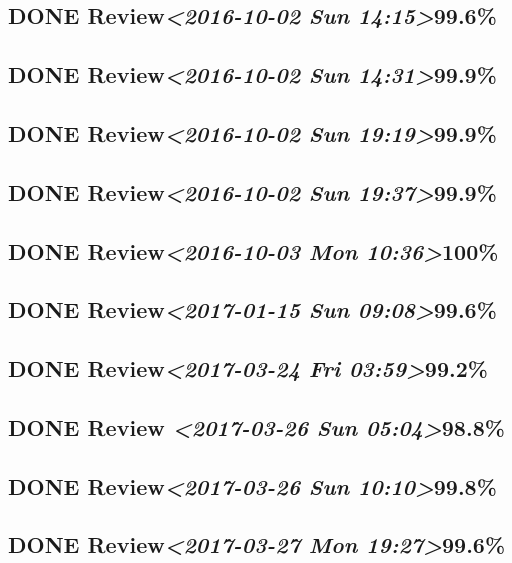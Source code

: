\documentclass[11pt]{ctexart}
\begin{document}
\subsection{{\bfseries\sffamily DONE} Review\textit{<2016-10-02 Sun 14:15>}99.6\%}
\label{sec:orgaa104fb}
\subsection{{\bfseries\sffamily DONE} Review\textit{<2016-10-02 Sun 14:31>}99.9\%}
\label{sec:org851fc4e}
\subsection{{\bfseries\sffamily DONE} Review\textit{<2016-10-02 Sun 19:19>}99.9\%}
\label{sec:orgf1fa181}
\subsection{{\bfseries\sffamily DONE} Review\textit{<2016-10-02 Sun 19:37>}99.9\%}
\label{sec:org8ce1131}
\subsection{{\bfseries\sffamily DONE} Review\textit{<2016-10-03 Mon 10:36>}100\%}
\label{sec:org03198c6}
\subsection{{\bfseries\sffamily DONE} Review\textit{<2017-01-15 Sun 09:08>}99.6\%}
\label{sec:org7658aea}
\subsection{{\bfseries\sffamily DONE} Review\textit{<2017-03-24 Fri 03:59>}99.2\%}
\label{sec:orgfa7019e}
\subsection{{\bfseries\sffamily DONE} Review \textit{<2017-03-26 Sun 05:04>}98.8\%}
\label{sec:org9313d09}
\subsection{{\bfseries\sffamily DONE} Review\textit{<2017-03-26 Sun 10:10>}99.8\%}
\label{sec:org5d95c14}
\subsection{{\bfseries\sffamily DONE} Review\textit{<2017-03-27 Mon 19:27>}99.6\%}
\label{sec:orgbedb7db}
\end{document}
